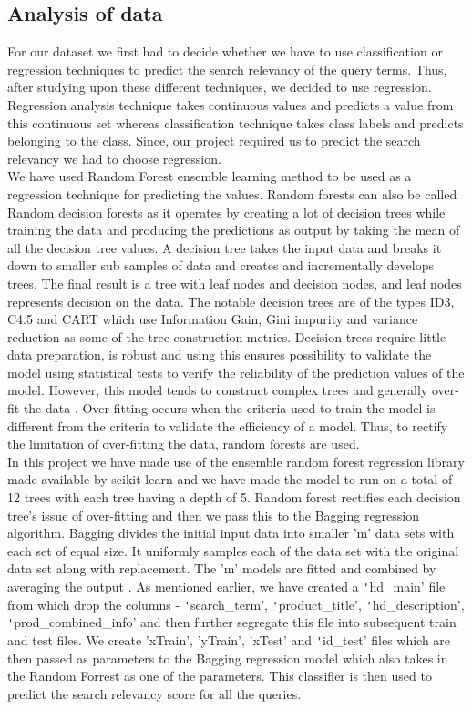 \documentclass{sig-alternate-05-2015}
\begin{document}
\subsection{Analysis of data}
For our dataset we first had to decide whether we have to use classification or regression techniques to predict the search relevancy of the query terms. Thus, after studying upon these different techniques, we decided to use regression. Regression analysis technique takes continuous values and predicts a value from this continuous set whereas classification technique takes class labels and predicts belonging to the class. Since, our project required us to predict the search relevancy we had to choose regression. \\
\newline
We have used Random Forest ensemble learning method to be used as a regression technique for predicting the values. Random forests can also be called Random decision forests as it operates by creating a lot of decision trees while training the data and producing the predictions as output by taking the mean of all the decision tree values. A decision tree takes the input data and breaks it down to smaller sub samples of data and creates and incrementally develops trees. The final result is a tree with leaf nodes and decision nodes, and leaf nodes represents decision on the data. The notable decision trees are of the types ID3, C4.5 and CART which use Information Gain, Gini impurity and variance reduction as some of the tree construction metrics. Decision trees require little data preparation, is robust and using this ensures possibility to validate the model using statistical tests to verify the reliability of the prediction values of the model. However, this model tends to construct complex trees and generally over-fit the data \cite{www-wikiDecisionTree}. Over-fitting occurs when the criteria used to train the model is different from the criteria to validate the efficiency of a model. Thus, to rectify the limitation of over-fitting the data, random forests are used.\\
In this project we have made use of the ensemble random forest regression library made available by scikit-learn and we have made the model to run on a total of 12 trees with each tree having a depth of 5. Random forest rectifies each decision tree's issue of over-fitting and then we pass this to the Bagging regression algorithm. Bagging divides the initial input data into smaller 'm' data sets with each set of equal size. It uniformly samples each of the data set with the original data set along with replacement. The 'm' models are fitted and combined by averaging the output \cite{www-bootstrapAggre}. As mentioned earlier, we have created a \texttt'{hd\_main}' file from which drop the columns - \texttt'{search\_term}', \texttt'{product\_title}', \texttt'{hd\_description}', \texttt'{prod\_combined\_info}' and then further segregate this file into subsequent train and test files. We create 'xTrain', 'yTrain', 'xTest' and \texttt'{id\_test}' files which are then passed as parameters to the Bagging regression model which also takes in the Random Forrest as one of the parameters. This classifier is then used to predict the search relevancy score for all the queries. 
\end{document}
